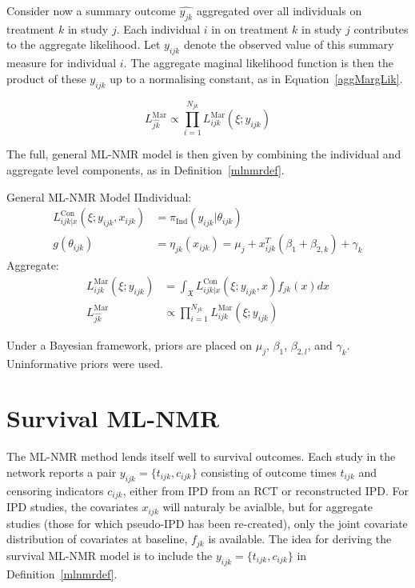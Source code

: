 Consider now a summary outcome $\hat{y_{jk}}$ aggregated over all individuals on treatment $k$ in study $j$. Each individual $i$ in on treatment $k$ in study $j$ contributes to the aggregate likelihood. Let $y_{ijk}$ denote the observed value of this summary measure for individual $i$. The aggregate maginal likelihood function is then the product of these $y_{ijk}$ up to a normalising constant, as in Equation~\ref{aggMargLik}.

\begin{equation}
    L_{\hat{jk}}^{\text{Mar}} \propto \prod_{i = 1}^{N_{jk}}L_{ijk}^{\text{Mar}}(\xi; y_{ijk})
    \label{aggMargLik}
\end{equation}

The full, general ML-NMR model is then given by combining the individual and aggregate level components, as in Definition~\ref{mlnmrdef}.

\begin{definition}[label=mlnmrdef]{General ML-NMR Model}
    IIndividual:
    \begin{align}
        L_{ijk|x}^{\text{Con}}(\xi;y_{ijk},x_{ijk}) &= \pi_{\text{Ind}}(y_{ijk}|\theta_{ijk}) \\
        g(\theta_{ijk}) &= \eta_{jk}(x_{ijk}) = \mu_j + x_{ijk}^T(\beta_1 + \beta_{2,k}) + \gamma_k \label{mlnmragg}
    \end{align}
    Aggregate:
    \begin{align}
        L_{ijk}^{\text{Mar}}(\xi; y_{ijk}) &= \int_{\mathfrak{X}} L_{ijk|x}^{\text{Con}}(\xi; y_{ijk}, x)f_{jk}(x)dx \label{mlnnmrint}\\
        L_{\hat{jk}}^{\text{Mar}} &\propto \prod_{i = 1}^{N_{jk}}L_{ijk}^{\text{Mar}}(\xi; y_{ijk})
    \end{align}
\end{definition}

Under a Bayesian framework, priors are placed on $\mu_j$, $\beta_1$, $\beta_{2,l}$, and $\gamma_k$. Uninformative priors were used.

\section{Survival ML-NMR}
The ML-NMR method lends itself well to survival outcomes. Each study in the network reports a pair $y_{ijk} = \{t_{ijk}, c_{ijk}\}$ consisting of outcome times $t_{ijk}$ and censoring indicators $c_{ijk}$, either from IPD from an RCT or reconstructed IPD. For IPD studies, the covariates $x_{ijk}$ will naturaly be avialble, but for aggregate studies (those for which pseudo-IPD has been re-created), only the joint covariate distribution of covariates at baseline, $f_{jk}$ is available. The idea for deriving the survival ML-NMR model is to include the $y_{ijk} = \{t_{ijk}, c_{ijk}\}$ in Definition~\ref{mlnmrdef}. \\

